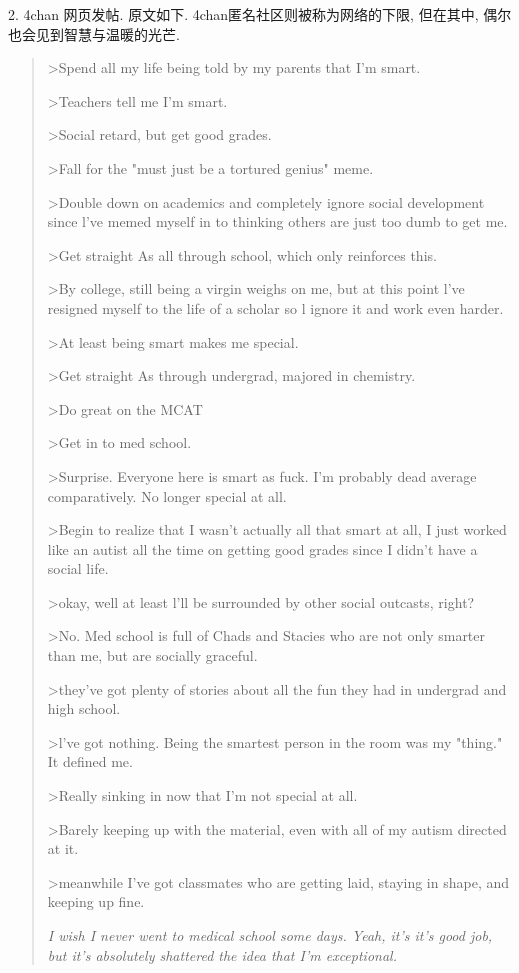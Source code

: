 \documentclass[a4paper, 12pt, UTF8]{article}
\begin{document}
2. 4chan 网页发帖. 原文如下. 4chan匿名社区则被称为网络的下限, 但在其中, 偶尔也会见到智慧与温暖的光芒.
\begin{quote}
    >Spend all my life being told by my parents that I'm smart. 
    
    >Teachers tell me I'm smart. 
    
    >Social retard, but get good grades. 
    
    >Fall for the "must just be a tortured genius" meme. 
    
    >Double down on academics and completely ignore social development since l've memed myself in to thinking others are just too dumb to get me. 

    >Get straight As all through school, which only reinforces this. 
    
    >By college, still being a virgin weighs on me, but at this point l've resigned myself to the life of a scholar so l ignore it and work even harder. 
    
    >At least being smart makes me special. 
    
    >Get straight As through undergrad, majored in chemistry. 
    
    >Do great on the MCAT 
    
    >Get in to med school. 
    
    >Surprise. Everyone here is smart as fuck. I'm probably dead average comparatively. No longer special at all. 
    
    >Begin to realize that I wasn't actually all that smart at all, I just worked like an autist all the time on getting good grades since I didn't have a social life. 
    
    >okay, well at least l'll be surrounded by other social outcasts, right? 
    
    >No. Med school is full of Chads and Stacies who are not only smarter than me, but are socially graceful. 
    
    >they've got plenty of stories about all the fun they had in undergrad and high school. 
    
    >l've got nothing. Being the smartest person in the room was my "thing." It defined me. 
    
    >Really sinking in now that I'm not special at all. 
    
    >Barely keeping up with the material, even with all of my autism directed at it. 
    
    >meanwhile I've got classmates who are getting laid, staying in shape, and keeping up fine. 
    
    \emph{I wish I never went to medical school some days. Yeah, it's it's good job, but it's absolutely shattered the idea that I'm exceptional.}
\end{quote}
\end{document}
